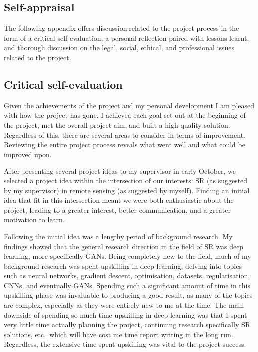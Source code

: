 \begin{appendices}
\chapter{Self-appraisal}
The following appendix offers discussion related to the project process in the form of a critical self-evaluation, a personal reflection paired with lessons learnt, and thorough discussion on the legal, social, ethical, and professional issues related to the project.

\section{Critical self-evaluation}
Given the achievements of the project and my personal development I am pleased with how the project has gone. I achieved each goal set out at the beginning of the project, met the overall project aim, and built a high-quality solution. Regardless of this, there are several areas to consider in terms of improvement. Reviewing the entire project process reveals what went well and what could be improved upon.

After presenting several project ideas to my supervisor in early October, we selected a project idea within the intersection of our interests: SR (as suggested by my supervisor) in remote sensing (as suggested by myself). Finding an initial idea that fit in this intersection meant we were both enthusiastic about the project, leading to a greater interest, better communication, and a greater motivation to learn. 

Following the initial idea was a lengthy period of background research. My findings showed that the general research direction in the field of SR was deep learning, more specifically GANs. Being completely new to the field, much of my background research was spent upskilling in deep learning, delving into topics such as neural networks, gradient descent, optimisation, datasets, regularisation, CNNs, and eventually GANs. Spending such a significant amount of time in this upskilling phase was invaluable to producing a good result, as many of the topics are complex, especially as they were entirely new to me at the time. The main downside of spending so much time upskilling in deep learning was that I spent very little time actually planning the project, continuing research specifically SR solutions, etc.\ which will have cost me time report writing in the long run. Regardless, the extensive time spent upskilling was vital to the project success.


\end{appendices}
